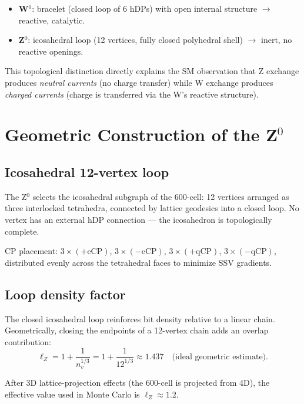 \documentclass[11pt,letterpaper]{article}
\begin{document}
\begin{itemize}
\item \textbf{W$^0$}: bracelet (closed loop of 6 hDPs) with open
  internal structure $\to$ reactive, catalytic.
\item \textbf{Z$^0$}: icosahedral loop (12 vertices, fully closed
  polyhedral shell) $\to$ inert, no reactive openings.
\end{itemize}

This topological distinction directly explains the SM observation that
Z exchange produces \emph{neutral currents} (no charge transfer)
while W exchange produces \emph{charged currents} (charge is
transferred via the W's reactive structure).

\section{Geometric Construction of the Z$^0$}

\subsection{Icosahedral 12-vertex loop}

The Z$^0$ selects the icosahedral subgraph of the 600-cell: 12
vertices arranged as three interlocked tetrahedra, connected by
lattice geodesics into a closed loop.  No vertex has an external
hDP connection --- the icosahedron is topologically complete.

CP placement: $3{\times}(+\text{eCP})$, $3{\times}(-\text{eCP})$,
$3{\times}(+\text{qCP})$, $3{\times}(-\text{qCP})$, distributed
evenly across the tetrahedral faces to minimize SSV gradients.

\subsection{Loop density factor}

The closed icosahedral loop reinforces bit density relative to a
linear chain.  Geometrically, closing the endpoints of a 12-vertex
chain adds an overlap contribution:
\begin{equation}
\ell_Z
= 1 + \frac{1}{n_v^{1/3}}
= 1 + \frac{1}{12^{1/3}}
\approx 1.437
\quad\text{(ideal geometric estimate)}.
\label{eq:lZ_ideal}
\end{equation}

After 3D lattice-projection effects (the 600-cell is projected from
4D), the effective value used in Monte Carlo is $\ell_Z \approx 1.2$.
\end{document}
